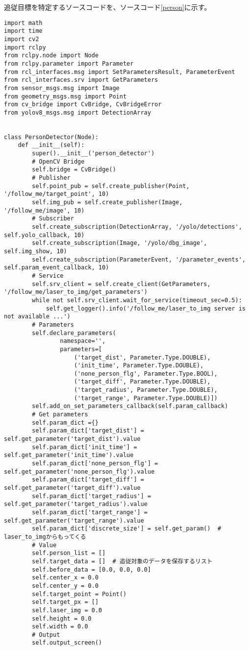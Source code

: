 追従目標を特定するソースコードを、ソースコード\ref{person}に示す。
\begin{lstlisting}[caption=person\_detector.py, label=person]
import math
import time
import cv2
import rclpy
from rclpy.node import Node
from rclpy.parameter import Parameter
from rcl_interfaces.msg import SetParametersResult, ParameterEvent
from rcl_interfaces.srv import GetParameters
from sensor_msgs.msg import Image
from geometry_msgs.msg import Point
from cv_bridge import CvBridge, CvBridgeError
from yolov8_msgs.msg import DetectionArray


class PersonDetector(Node):
    def __init__(self):
        super().__init__('person_detector')
        # OpenCV Bridge
        self.bridge = CvBridge()
        # Publisher
        self.point_pub = self.create_publisher(Point, '/follow_me/target_point', 10)
        self.img_pub = self.create_publisher(Image, '/follow_me/image', 10)
        # Subscriber
        self.create_subscription(DetectionArray, '/yolo/detections', self.yolo_callback, 10)
        self.create_subscription(Image, '/yolo/dbg_image', self.img_show, 10)
        self.create_subscription(ParameterEvent, '/parameter_events', self.param_event_callback, 10)
        # Service
        self.srv_client = self.create_client(GetParameters, '/follow_me/laser_to_img/get_parameters')
        while not self.srv_client.wait_for_service(timeout_sec=0.5):
            self.get_logger().info('/follow_me/laser_to_img server is not available ...')
        # Parameters
        self.declare_parameters(
                namespace='',
                parameters=[
                    ('target_dist', Parameter.Type.DOUBLE),
                    ('init_time', Parameter.Type.DOUBLE),
                    ('none_person_flg', Parameter.Type.BOOL),
                    ('target_diff', Parameter.Type.DOUBLE),
                    ('target_radius', Parameter.Type.DOUBLE),
                    ('target_range', Parameter.Type.DOUBLE)])
        self.add_on_set_parameters_callback(self.param_callback)
        # Get parameters
        self.param_dict ={}
        self.param_dict['target_dist'] = self.get_parameter('target_dist').value
        self.param_dict['init_time'] = self.get_parameter('init_time').value
        self.param_dict['none_person_flg'] = self.get_parameter('none_person_flg').value
        self.param_dict['target_diff'] = self.get_parameter('target_diff').value
        self.param_dict['target_radius'] = self.get_parameter('target_radius').value
        self.param_dict['target_range'] = self.get_parameter('target_range').value
        self.param_dict['discrete_size'] = self.get_param()  # laser_to_imgからもってくる
        # Value
        self.person_list = []
        self.target_data = []  # 追従対象のデータを保存するリスト
        self.before_data = [0.0, 0.0, 0.0]
        self.center_x = 0.0
        self.center_y = 0.0
        self.target_point = Point()
        self.target_px = []
        self.laser_img = 0.0
        self.height = 0.0
        self.width = 0.0
        # Output
        self.output_screen()


\end{lstlisting}
